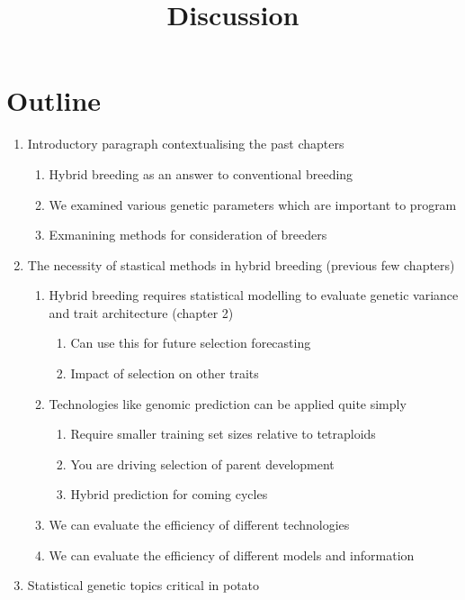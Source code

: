 \documentclass[
]{article}
\title{Discussion}
\author{}
\date{}
\providecommand{\tightlist}{%
  \setlength{\itemsep}{0pt}\setlength{\parskip}{0pt}}\usepackage{longtable,booktabs,array}
\begin{document}
\maketitle


\section{Outline}\label{outline}

\begin{enumerate}
\def\labelenumi{\arabic{enumi}.}
\tightlist
\item
  Introductory paragraph contextualising the past chapters

  \begin{enumerate}
  \def\labelenumii{\roman{enumii})}
  \tightlist
  \item
    Hybrid breeding as an answer to conventional breeding
  \item
    We examined various genetic parameters which are important to
    program
  \item
    Exmanining methods for consideration of breeders
  \end{enumerate}
\item
  The necessity of stastical methods in hybrid breeding (previous few
  chapters)

  \begin{enumerate}
  \def\labelenumii{\roman{enumii})}
  \tightlist
  \item
    Hybrid breeding requires statistical modelling to evaluate genetic
    variance and trait architecture (chapter 2)

    \begin{enumerate}
    \def\labelenumiii{\Alph{enumiii}.}
    \tightlist
    \item
      Can use this for future selection forecasting
    \item
      Impact of selection on other traits
    \end{enumerate}
  \item
    Technologies like genomic prediction can be applied quite simply

    \begin{enumerate}
    \def\labelenumiii{\Alph{enumiii}.}
    \tightlist
    \item
      Require smaller training set sizes relative to tetraploids
    \item
      You are driving selection of parent development
    \item
      Hybrid prediction for coming cycles
    \end{enumerate}
  \item
    We can evaluate the efficiency of different technologies
  \item
    We can evaluate the efficiency of different models and information
  \end{enumerate}
\item
  Statistical genetic topics critical in potato


\end{enumerate}
\end{document}

